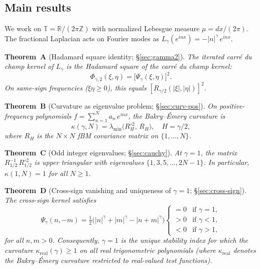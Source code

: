 \documentclass[11pt,a4paper]{article}
\theoremstyle{plain}
\theoremstyle{definition}
\theoremstyle{remark}
\newcommand{\R}{\mathbb{R}}
\newcommand{\Z}{\mathbb{Z}}
\newcommand{\T}{\mathbb{T}}
\begin{document}
\subsection{Main results}

We work on $\T = \R/(2\pi\Z)$ with normalized Lebesgue measure
$\mu = dx/(2\pi)$. The fractional Laplacian acts on Fourier modes as
$L_\gamma(e^{inx}) = -|n|^\gamma\,e^{inx}$.

\medskip\noindent
\textbf{Theorem~A} (Hadamard square identity; \S\ref{sec:gamma2}).
\emph{The iterated carr\'e du champ kernel of $L_\gamma$ is the
Hadamard square of the carr\'e du champ kernel:
\begin{equation}\label{eq:intro-A}
  \Phi_{\gamma,2}(\xi,\eta)
  = \bigl[\Psi_\gamma(\xi,\eta)\bigr]^2.
\end{equation}
On same-sign frequencies ($\xi\eta \geq 0$), this equals
$[R_{\gamma/2}(|\xi|,|\eta|)]^2$.}

\medskip\noindent
\textbf{Theorem~B} (Curvature as eigenvalue problem; \S\ref{sec:curv-pos}).
\emph{On positive-frequency polynomials $f = \sum_{n=1}^N a_n\,e^{inx}$,
the Bakry--\'Emery curvature is
\begin{equation}\label{eq:intro-B}
  \kappa(\gamma, N) = \lambda_{\min}\!\bigl(R_H^{\circ 2},\, R_H\bigr),
  \quad H = \gamma/2,
\end{equation}
where $R_H$ is the $N \times N$ fBM covariance matrix on $\{1,\ldots,N\}$.}

\medskip\noindent
\textbf{Theorem~C} (Odd integer eigenvalues; \S\ref{sec:cauchy}).
\emph{At $\gamma = 1$, the matrix $R_{1/2}^{-1}\,R_{1/2}^{\circ 2}$ is
upper triangular with eigenvalues $\{1, 3, 5, \ldots, 2N-1\}$.
In particular, $\kappa(1,N) = 1$ for all $N \geq 1$.}

\medskip\noindent
\textbf{Theorem~D} (Cross-sign vanishing and uniqueness of $\gamma=1$; \S\ref{sec:cross-sign}).
\emph{The cross-sign kernel satisfies
\begin{equation}\label{eq:intro-D}
  \Psi_\gamma(n,-m) = \tfrac{1}{2}\bigl(|n|^\gamma + |m|^\gamma
  - |n+m|^\gamma\bigr)
  \begin{cases}
    = 0 & \text{if } \gamma = 1, \\
    > 0 & \text{if } \gamma < 1, \\
    < 0 & \text{if } \gamma > 1,
  \end{cases}
\end{equation}
for all $n,m > 0$. Consequently, $\gamma = 1$ is the unique stability
index for which the curvature
$\kappa_{\mathrm{real}}(\gamma) \geq 1$ on all real
trigonometric polynomials (where $\kappa_{\mathrm{real}}$ denotes the
Bakry--\'Emery curvature restricted to real-valued test functions).}
\end{document}
